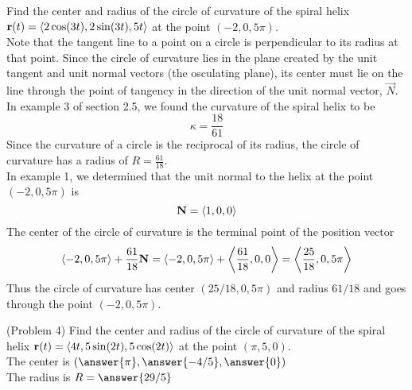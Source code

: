 \documentclass[handout]{ximera}
\begin{document}
\begin{example}[Example 4]
Find the center and radius of the circle of curvature of the spiral helix $\mathbf r(t) =  \left\langle 2\cos(3t), 2\sin(3t), 5t\right\rangle$ at the point $(-2, 0, 5\pi)$.\\

Note that the tangent line to a point on a circle is perpendicular to its radius at that point. 
Since the circle of curvature lies in the plane created by the unit tangent and unit normal vectors (the osculating plane),
its center must lie on the line through the point of tangency in the direction of the unit normal vector, $\vec N$.\\

In example 3 of section 2.5, we found the curvature of the spiral helix to be 
\[
\kappa = \frac{18}{61}
\]
Since the curvature of a circle is the reciprocal of its radius, the circle of curvature has a radius of $R = \frac{61}{18}$.\\

In example 1, we determined that the unit normal to the helix at the point $(-2, 0, 5\pi)$ is
\[
\mathbf N = \left\langle 1, 0, 0\right\rangle
\]
The center of the circle of curvature is the terminal point of the position vector 
\[
\left\langle -2, 0, 5\pi\right\rangle + \frac{61}{18}\mathbf N = \left\langle -2, 0, 5\pi\right\rangle + \left\langle \frac{61}{18}, 0, 0\right\rangle = \left\langle \frac{25}{18} , 0, 5\pi\right\rangle
\]
Thus the circle of curvature has center $(25/18, 0, 5\pi)$ and radius $61/18$ and goes through the point $(-2, 0, 5\pi)$.
\end{example}

\begin{problem}(Problem 4)
Find the center and radius of the circle of curvature of the spiral helix $\mathbf r(t) = \left\langle 4t, 5 \sin(2t),5\cos(2t)\right\rangle$ at the point $(\pi, 5, 0)$.\\

The center is $\left(\answer{\pi}, \answer{-4/5}, \answer{0}\right)$\\
The radius is $R = \answer{29/5}$
\end{problem}
\end{document}
